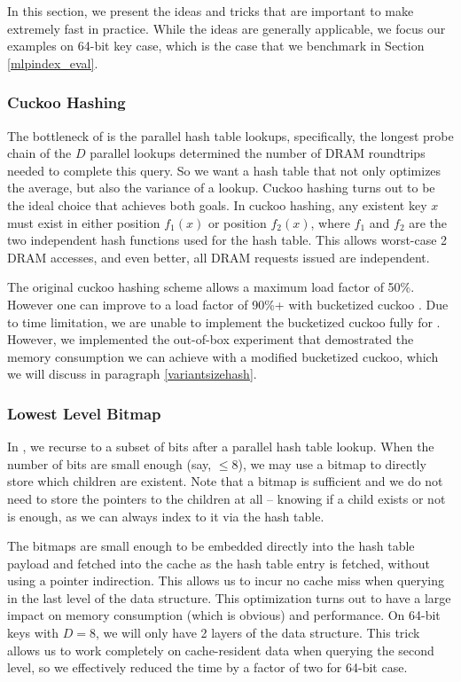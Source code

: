 \documentclass[11pt, usletter]{article}
\begin{document}
In this section, we present the ideas and tricks that are important to make \MlpIndex 
extremely fast in practice. While the ideas are generally applicable, 
we focus our examples on 64-bit key case, which is the case that we benchmark in Section \ref{mlpindex_eval}.

\subsubsection*{Cuckoo Hashing}

The bottleneck of \MlpIndex is the parallel hash table lookups, 
specifically, the longest probe chain of the $D$ parallel lookups determined the number 
of DRAM roundtrips needed to complete this query. 
So we want a hash table that not only optimizes the average, but also the variance of a lookup. 
Cuckoo hashing \cite{cuckoohash} turns out to be the ideal choice that achieves both goals. 
In cuckoo hashing, any existent key $x$ must exist in either position $f_1(x)$ 
or position $f_2(x)$, where $f_1$ and $f_2$ are the two independent hash functions used for the hash table.
This allows worst-case 2 DRAM accesses, and even better, all DRAM requests issued are independent. 

The original cuckoo hashing scheme allows a maximum load factor of 50\%. 
However one can improve to a load factor of 90\%+ with bucketized cuckoo \cite{bucketcuckoo}. 
Due to time limitation, we are unable to implement the bucketized cuckoo fully for \MlpIndex. 
However, we implemented the out-of-box experiment that 
demostrated the memory consumption we can achieve with a modified bucketized cuckoo, 
which we will discuss in paragraph \ref{variantsizehash}.

\subsubsection*{Lowest Level Bitmap} \label{lowestlevelbitmap}

In \MlpIndex, we recurse to a subset of bits after a parallel hash table lookup. 
When the number of bits are small enough (say, $\leq 8$), we may use a bitmap 
to directly store which children are existent. 
Note that a bitmap is sufficient and we do not need to store the pointers to the children at all -- 
knowing if a child exists or not is enough, as we can always index to it via the hash table.

The bitmaps are small enough to be embedded directly into the hash table payload 
and fetched into the cache as the hash table entry is fetched, without using a pointer indirection. 
This allows us to incur no cache miss when querying in the last level of the data structure. 
This optimization turns out to have a large impact on memory consumption (which is obvious) and performance. 
On 64-bit keys with $D=8$, we will only have 2 layers of the data structure. 
This trick allows us to work completely on cache-resident data when querying the second level, 
so we effectively reduced the time by a factor of two for 64-bit case.
\end{document}
